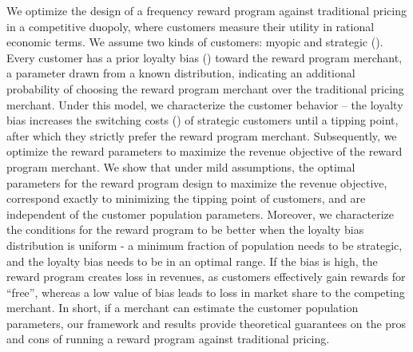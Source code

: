 We optimize the design of a frequency reward program against traditional pricing in a competitive duopoly, where customers measure their utility in rational economic terms.
We assume two kinds of customers: myopic and strategic (\cite{yilmaz2016upgrade}). 
Every customer has a prior loyalty bias (\cite{fader1993excess}) toward the reward program merchant, a parameter drawn from a known distribution, indicating an additional probability of choosing the reward program merchant over the traditional pricing merchant.
Under this model, we characterize the customer behavior -- the loyalty bias increases the switching costs (\cite{klemperer1995competition}) of strategic customers until a tipping point, after which they strictly prefer the reward program merchant. 
Subsequently, we optimize the reward parameters to maximize the revenue objective of the reward program merchant.
We show that under mild assumptions, the optimal parameters for the reward program design to maximize the revenue objective, correspond exactly to minimizing the tipping point of customers, and are independent of the customer population parameters. 
Moreover, we characterize the conditions for the reward program to be better when the loyalty bias distribution is uniform - a minimum fraction of population needs to be strategic, and the loyalty bias needs to be in an optimal range.
If the bias is high, the reward program creates loss in revenues, as customers effectively gain rewards for ``free'', whereas a low value of bias leads to loss in market share to the competing merchant.
In short, if a merchant can estimate the customer population parameters, our framework and results provide theoretical guarantees on the pros and cons of running a reward program against traditional pricing.
